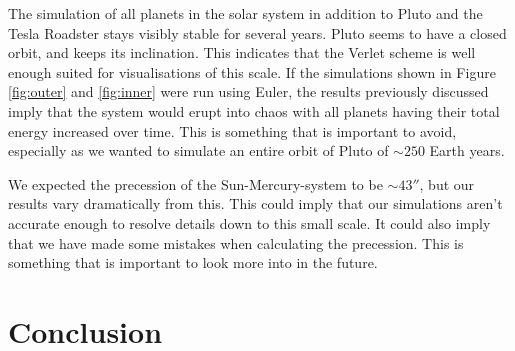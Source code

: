 \documentclass[twocolumn]{aastex62}
\begin{document}
The simulation of all planets in the solar system in addition to Pluto and 
the Tesla Roadster stays visibly stable for several years. Pluto seems to 
have a closed orbit, and keeps its inclination. This indicates that 
the Verlet scheme is well enough suited for visualisations of this scale. 
If the simulations shown in Figure \ref{fig:outer} and \ref{fig:inner} 
were run using Euler, the results previously discussed imply that the 
system would erupt into chaos with all planets having their total energy 
increased over time. This is something that is important to avoid, 
especially as we wanted to simulate an entire orbit of Pluto of $\sim 250$  
Earth years.

We expected the precession of the Sun-Mercury-system to be $\sim 43''$, 
but our results vary dramatically from this. This could imply that our 
simulations aren't accurate enough to resolve details down to this small 
scale. It could also imply that we have made some mistakes when 
calculating the precession. This is something that is important to look 
more into in the future. 




\section{Conclusion} \label{sec:conclusion}


\newpage


\end{document}

